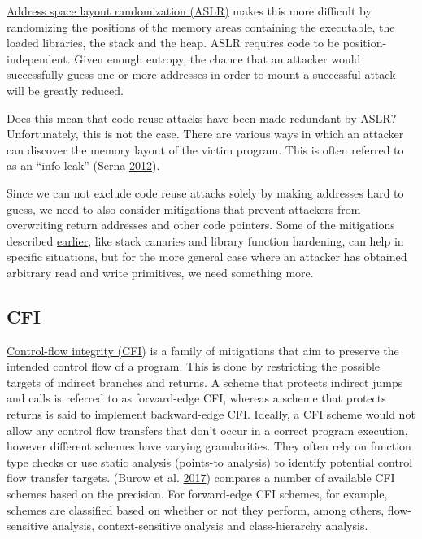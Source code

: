 \documentclass[a4paper,]{report}
\begin{document}
\href{https://en.wikipedia.org/wiki/Address_space_layout_randomization}{Address
space layout randomization (ASLR)} makes this more difficult
by randomizing the positions of the memory areas containing the
executable, the loaded libraries, the stack and the heap. ASLR requires
code to be position-independent. Given enough entropy, the chance that
an attacker would successfully guess one or more addresses in order to
mount a successful attack will be greatly reduced.

Does this mean that code reuse attacks have been made redundant by ASLR?
Unfortunately, this is not the case. There are various ways in which an
attacker can discover the memory layout of the victim program. This is
often referred to as an ``info leak'' (Serna
\protect\hyperlink{ref-Serna2012}{2012}).

Since we can not exclude code reuse attacks solely by making addresses
hard to guess, we need to also consider mitigations that prevent
attackers from overwriting return addresses and other code pointers.
Some of the mitigations described
\protect\hyperlink{stack-buffer-overflows}{earlier}, like stack canaries
and library function hardening, can help in specific situations, but for
the more general case where an attacker has obtained arbitrary read and
write primitives, we need something more.

\hypertarget{cfi}{%
\subsection{CFI}\label{cfi}}

\href{https://en.wikipedia.org/wiki/Control-flow_integrity}{Control-flow
integrity (CFI)} is a family of mitigations that aim to
preserve the intended control flow of a program. This is done by
restricting the possible targets of indirect branches and returns. A
scheme that protects indirect jumps and calls is referred to as
forward-edge CFI, whereas a scheme that protects
returns is said to implement backward-edge CFI.
Ideally, a CFI scheme would not allow any control flow transfers that
don't occur in a correct program execution, however different schemes
have varying granularities. They often rely on function type checks or
use static analysis (points-to analysis) to identify potential control
flow transfer targets. (Burow et al.
\protect\hyperlink{ref-Burow2017}{2017}) compares a number of available
CFI schemes based on the precision. For forward-edge CFI schemes, for
example, schemes are classified based on whether or not they perform,
among others, flow-sensitive analysis, context-sensitive analysis and
class-hierarchy analysis.
\end{document}
